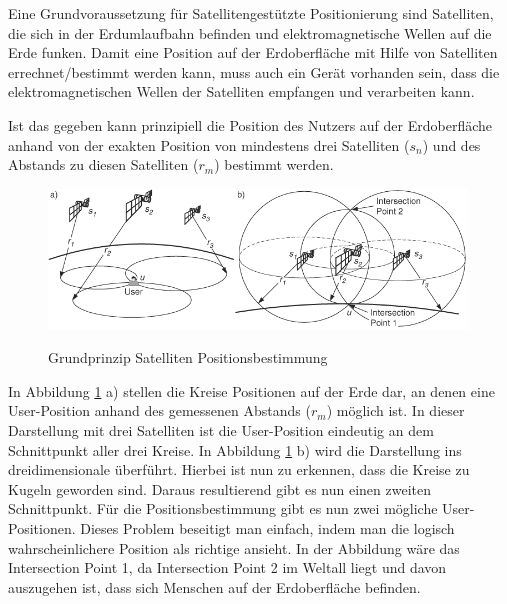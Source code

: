 Eine Grundvoraussetzung für Satellitengestützte Positionierung sind Satelliten, die sich in der Erdumlaufbahn befinden und elektromagnetische Wellen auf die Erde funken. Damit eine Position auf der Erdoberfläche mit Hilfe von Satelliten errechnet/bestimmt werden kann, muss auch ein Gerät vorhanden sein, dass die elektromagnetischen Wellen der Satelliten empfangen und verarbeiten kann.

Ist das gegeben kann prinzipiell die Position des Nutzers auf der Erdoberfläche anhand von der exakten Position von mindestens drei Satelliten ($s_{n}$) und des Abstands zu diesen Satelliten ($r_{m}$) bestimmt werden.

\cite[S. 188]{Schiller2004}


\begin{figure}[h]
\centering
\includegraphics[width=0.99\textwidth]{ref/images/prinzip_satelliten.png}
\caption[Grundprinzip Satelliten Positionsbestimmung]{Grundprinzip Satelliten Positionsbestimmung}
\label{fig:Grundprinzip Satelliten}
\cite[S. 188]{Schiller2004}
\end{figure}

In Abbildung \ref{fig:Grundprinzip Satelliten} a) stellen die Kreise Positionen auf der Erde dar, an denen eine User-Position anhand des gemessenen Abstands ($r_{m}$) möglich ist. In dieser Darstellung mit drei Satelliten ist die User-Position eindeutig an dem Schnittpunkt aller drei Kreise. 
In Abbildung \ref{fig:Grundprinzip Satelliten} b) wird die Darstellung ins dreidimensionale überführt. Hierbei ist nun zu erkennen, dass die Kreise zu Kugeln geworden sind. Daraus resultierend gibt es nun einen zweiten Schnittpunkt. Für die Positionsbestimmung gibt es nun zwei mögliche User-Positionen. Dieses Problem beseitigt man einfach, indem man die logisch wahrscheinlichere Position als richtige ansieht. In der Abbildung wäre das Intersection Point 1, da Intersection Point 2 im Weltall liegt und davon auszugehen ist, dass sich Menschen auf der Erdoberfläche befinden.
\cite[S. 188]{Schiller2004}

